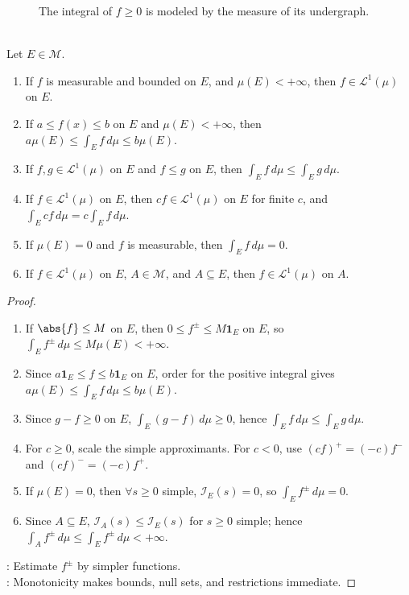 \begin{figure}[H]
  \centering
  
  \caption{The integral of $f\geq0$ is modeled by the measure of its undergraph.}
  \label{fig:lebesgue-undergraph}
\end{figure}

\begin{proposition} \label{prop:basic-lebesgue-integral-properties} \\
Let $E\in\mathcal{M}$.
\begin{enumerate}[label=(\roman*)]
\setlength{\itemsep}{0pt}
\item If $f$ is measurable and bounded on $E$, and $\mu(E)<+\infty$, then $f\in\mathscr{L}^1(\mu)$ on $E$.
\item If $a\leq f(x)\leq b$ on $E$ and $\mu(E)<+\infty$, then $a\mu(E)\leq\int_E f\,d\mu\leq b\mu(E)$.
\item If $f,g\in\mathscr{L}^1(\mu)$ on $E$ and $f\leq g$ on $E$, then $\int_E f\,d\mu\leq\int_E g\,d\mu$.
\item If $f\in\mathscr{L}^1(\mu)$ on $E$, then $cf\in\mathscr{L}^1(\mu)$ on $E$ for finite $c$, and $\int_E cf\,d\mu=c\int_E f\,d\mu$.
\item If $\mu(E)=0$ and $f$ is measurable, then $\int_E f\,d\mu=0$.
\item If $f\in\mathscr{L}^1(\mu)$ on $E$, $A\in\mathcal{M}$, and $A\subseteq E$, then $f\in\mathscr{L}^1(\mu)$ on $A$.
\end{enumerate}
\begin{proof}
\begin{enumerate}[label=(\roman*)]
\setlength{\itemsep}{0pt}
\item If $\abs{f}\leq M$ on $E$, then $0\leq f^\pm\leq M\mathbf{1}_E$ on $E$, so $\int_Ef^\pm\,d\mu\leq M\mu(E)<+\infty$.
\item Since $a\mathbf{1}_E\leq f\leq b\mathbf{1}_E$ on $E$, order for the positive integral gives $a\mu(E)\leq\int_Ef\,d\mu\leq b\mu(E)$.
\item Since $g-f\geq0$ on $E$, $\int_E(g-f)\,d\mu\geq0$, hence $\int_Ef\,d\mu\leq\int_Eg\,d\mu$.
\item For $c\geq0$, scale the simple approximants. For $c<0$, use $(cf)^+=(-c)f^-$ and $(cf)^-=(-c)f^+$.
\item If $\mu(E)=0$, then $\forall s\geq0$ simple, $\mathcal{I}_E(s)=0$, so $\int_Ef^\pm\,d\mu=0$.
\item Since $A\subseteq E$, $\mathcal{I}_A(s)\leq \mathcal{I}_E(s)$ for $s\geq0$ simple; hence $\int_Af^\pm\,d\mu\leq\int_Ef^\pm\,d\mu<+\infty$.
\end{enumerate}
: Estimate $f^\pm$ by simpler functions.\\
: Monotonicity makes bounds, null sets, and restrictions immediate.
\end{proof}
\end{proposition}

